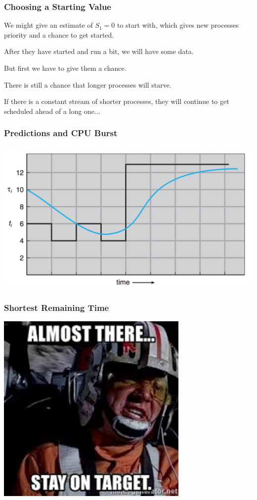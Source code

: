 \begin{frame}
\frametitle{Choosing a Starting Value}


We might give an estimate of $S_{1} = 0$ to start with, which gives new processes priority and a chance to get started. 

After they have started and run a bit, we will have some data. 

But first we have to give them a chance.

There is still a chance that longer processes will starve. 

If there is a constant stream of shorter processes, they will continue to get scheduled ahead of a long one...

\end{frame}

\begin{frame}
\frametitle{Predictions and CPU Burst}

\begin{center}
\includegraphics[width=\textwidth]{images/sjf-2.png}
\end{center}


\end{frame}


\begin{frame}
\frametitle{Shortest Remaining Time}

\begin{center}
	\includegraphics[width=0.7\textwidth]{images/stay-on-target.jpg}
\end{center}


\end{frame}


